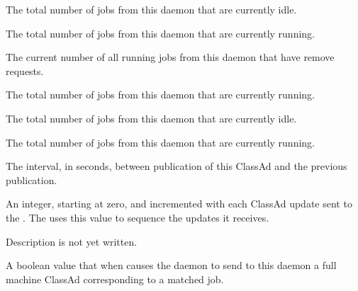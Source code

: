 \begin{description}
\item[\AdAttr{TotalLocalIdleJobs}:] The total number of 
    jobs from this
   daemon that are currently idle.

\item[\AdAttr{TotalLocalRunningJobs}:] The total number of 
    jobs from this
   daemon that are currently running.

\item[\AdAttr{TotalRemovedJobs}:] The current number of all running jobs
  from this  daemon that have remove requests.

\item[\AdAttr{TotalRunningJobs}:] The total number of jobs from this
   daemon that are currently running.

\item[\AdAttr{TotalSchedulerIdleJobs}:] The total number of 
    jobs from this
   daemon that are currently idle.

\item[\AdAttr{TotalSchedulerRunningJobs}:] The total number of 
    jobs from this
   daemon that are currently running.

\item[\AdAttr{UpdateInterval}:] The interval, in seconds,
  between publication of this  ClassAd and
  the previous publication.

\item[\AdAttr{UpdateSequenceNumber}:] An integer, starting at zero,
  and incremented with each ClassAd update sent to the .
  The  uses this value to sequence the updates it
  receives.

\item[\AdAttr{VirtualMemory}:] Description is not yet written.

\item[\AdAttr{WantResAd}:] A boolean value that when 
  causes the  daemon to send to this 
  daemon a full machine ClassAd corresponding to a matched job.


\end{description}

